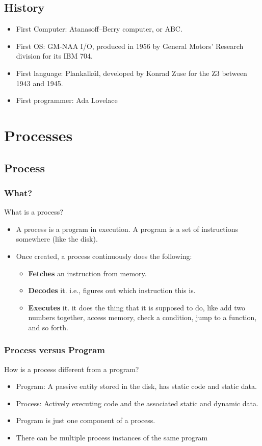 \documentclass[12pt]{article}
\begin{document}
\subsection{History}
\begin{itemize}
    \item First Computer: Atanasoff–Berry computer, or ABC.
    \item First OS: GM-NAA I/O, produced in 1956 by General Motors' Research division for its IBM 704.
    \item First language: Plankalkül, developed by Konrad Zuse for the Z3 between 1943 and 1945.
    \item First programmer: Ada Lovelace
\end{itemize}

\section{Processes}
\subsection{Process}
\subsubsection{What?}
What is a process?
\begin{itemize}
    \item A process is a program in execution. A program is a set of instructions somewhere (like the disk).
    \item Once created, a process continuously does the following: \begin{itemize}
        \item {\bfseries Fetches} an instruction from memory. 
        \item {\bfseries Decodes} it. i.e., figures out which instruction this is. 
        \item {\bfseries Executes} it. it does the thing that it is supposed to do, like add two numbers together, access memory, check a condition, jump to a function, and so forth.
    \end{itemize}
\end{itemize}

\subsubsection{Process versus Program}
How is a process different from a program?
\begin{itemize}
    \item Program: A passive entity stored in the disk, has static code and static data.
    \item Process: Actively executing code and the associated static and dynamic data.
    \item Program is just one component of a process.
    \item There can be multiple process instances of the same program
\end{itemize}
\end{document}
